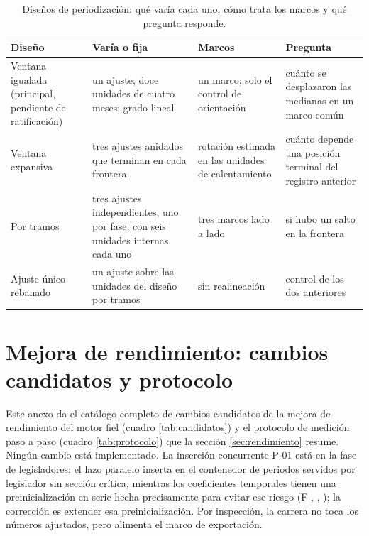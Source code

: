 \begin{table}[H]
\centering
\caption{Diseños de periodización: qué varía cada uno, cómo trata los marcos y qué pregunta
responde.}
\label{tab:disenos}
\footnotesize
\begin{tabular}{L{2.9cm}L{3.5cm}L{2.8cm}L{3.1cm}}
\toprule
Diseño & Varía o fija & Marcos & Pregunta \\
\midrule
Ventana igualada (principal, pendiente de ratificación) & un ajuste; doce unidades de cuatro
meses; grado lineal & un marco; solo el control de orientación & cuánto se desplazaron las
medianas en un marco común \\
\addlinespace
Ventana expansiva & tres ajustes anidados que terminan en cada frontera & rotación estimada en
las unidades de calentamiento & cuánto depende una posición terminal del registro anterior \\
\addlinespace
Por tramos & tres ajustes independientes, uno por fase, con seis unidades internas cada uno &
tres marcos lado a lado & si hubo un salto en la frontera \\
\addlinespace
Ajuste único rebanado & un ajuste sobre las unidades del diseño por tramos & sin realineación
& control de los dos anteriores \\
\bottomrule
\end{tabular}
\end{table}

\chapter[Mejora de rendimiento: cambios candidatos y protocolo][Mejora de rendimiento]{Mejora de rendimiento: cambios candidatos y protocolo}
\label{anexo:rendimiento}

Este anexo da el catálogo completo de cambios candidatos de la mejora de rendimiento del
motor fiel (cuadro \ref{tab:candidatos}) y el protocolo de medición paso a paso (cuadro
\ref{tab:protocolo}) que la sección \ref{sec:rendimiento} resume. Ningún cambio está
implementado. La inserción concurrente P-01 está en la fase de legisladores: el lazo paralelo
inserta en el contenedor de periodos servidos por legislador sin sección crítica, mientras los
coeficientes temporales tienen una preinicialización en serie hecha precisamente para evitar
ese riesgo (F , , ); la corrección
es extender esa preinicialización. Por inspección, la carrera no toca los números ajustados,
pero alimenta el marco de exportación.

